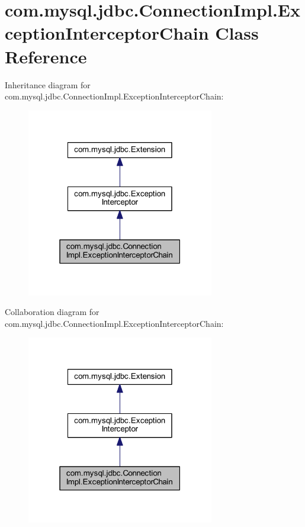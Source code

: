 \hypertarget{classcom_1_1mysql_1_1jdbc_1_1_connection_impl_1_1_exception_interceptor_chain}{}\section{com.\+mysql.\+jdbc.\+Connection\+Impl.\+Exception\+Interceptor\+Chain Class Reference}
\label{classcom_1_1mysql_1_1jdbc_1_1_connection_impl_1_1_exception_interceptor_chain}


Inheritance diagram for com.\+mysql.\+jdbc.\+Connection\+Impl.\+Exception\+Interceptor\+Chain\+:\nopagebreak
\begin{figure}[H]
\begin{center}
\leavevmode
\includegraphics[width=232pt]{classcom_1_1mysql_1_1jdbc_1_1_connection_impl_1_1_exception_interceptor_chain__inherit__graph}
\end{center}
\end{figure}


Collaboration diagram for com.\+mysql.\+jdbc.\+Connection\+Impl.\+Exception\+Interceptor\+Chain\+:\nopagebreak
\begin{figure}[H]
\begin{center}
\leavevmode
\includegraphics[width=232pt]{classcom_1_1mysql_1_1jdbc_1_1_connection_impl_1_1_exception_interceptor_chain__coll__graph}
\end{center}
\end{figure}
